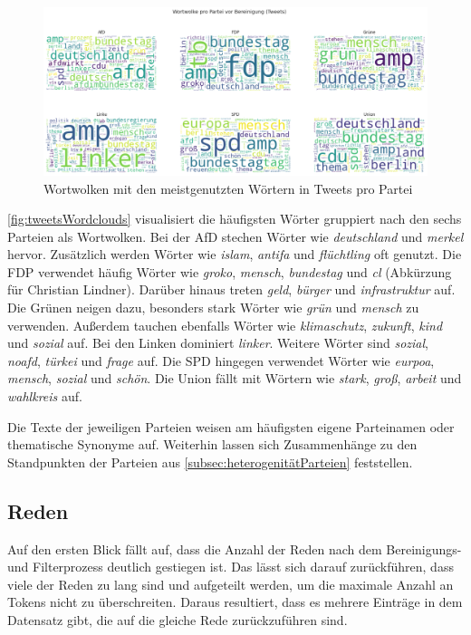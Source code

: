 \begin{figure}[H]
    \centering
    \includegraphics[width=\linewidth]{data/images/tweets/wortwolke_pro_partei_vor_bereinigung.png}
    \caption{Wortwolken mit den meistgenutzten Wörtern in Tweets pro Partei} \label{fig:tweetsWordclouds}
\end{figure}

\autoref{fig:tweetsWordclouds} visualisiert die häufigsten Wörter gruppiert nach den sechs Parteien als Wortwolken. Bei der \ac{AfD} stechen Wörter wie \textit{deutschland} und \textit{merkel} hervor. Zusätzlich werden Wörter wie \textit{islam}, \textit{antifa} und \textit{flüchtling} oft genutzt. Die \ac{FDP} verwendet häufig Wörter wie \textit{groko}, \textit{mensch}, \textit{bundestag} und \textit{cl} (Abkürzung für Christian Lindner). Darüber hinaus treten \textit{geld}, \textit{bürger} und \textit{infrastruktur} auf. Die Grünen neigen dazu, besonders stark Wörter wie \textit{grün} und \textit{mensch} zu verwenden. Außerdem tauchen ebenfalls Wörter wie \textit{klimaschutz}, \textit{zukunft}, \textit{kind} und \textit{sozial} auf. Bei den Linken dominiert \textit{linker}. Weitere Wörter sind \textit{sozial}, \textit{noafd}, \textit{türkei} und \textit{frage} auf. Die \ac{SPD} hingegen verwendet Wörter wie \textit{eurpoa}, \textit{mensch}, \textit{sozial} und \textit{schön}. Die Union fällt mit Wörtern wie \textit{stark}, \textit{groß}, \textit{arbeit} und \textit{wahlkreis} auf.

Die Texte der jeweiligen Parteien weisen am häufigsten eigene Parteinamen oder thematische Synonyme auf. Weiterhin lassen sich Zusammenhänge zu den Standpunkten der Parteien aus \autoref{subsec:heterogenitätParteien} feststellen.

\subsection*{Reden}

Auf den ersten Blick fällt auf, dass die Anzahl der Reden nach dem Bereinigungs- und Filterprozess deutlich gestiegen ist. Das lässt sich darauf zurückführen, dass viele der Reden zu lang sind und aufgeteilt werden, um die maximale Anzahl an Tokens nicht zu überschreiten. Daraus resultiert, dass es mehrere Einträge in dem Datensatz gibt, die auf die gleiche Rede zurückzuführen sind.

